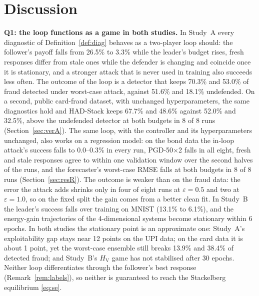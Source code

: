 \documentclass[conference]{IEEEtran}
\newcommand{\HV}{H_{\mathrm{V}}}
\begin{document}
\section{Discussion}\label{sec:disc}
\textbf{Q1: the loop functions as a game in both studies.} In Study~A every diagnostic of Definition~\ref{def:diag} behaves as a two-player loop should: the follower's payoff falls from 26.5\% to 3.3\% while the leader's budget rises, fresh responses differ from stale ones while the defender is changing and coincide once it is stationary, and a stronger attack that is never used in training also succeeds less often. The outcome of the loop is a detector that keeps 70.3\% and 53.0\% of fraud detected under worst-case attack, against 51.6\% and 18.1\% undefended. On a second, public card-fraud dataset, with unchanged hyperparameters, the same diagnostics hold and HAD-Stack keeps 67.7\% and 48.6\% against 52.0\% and 32.5\%, above the undefended detector at both budgets in 8 of 8 runs (Section~\ref{sec:verA}). The same loop, with the controller and its hyperparameters unchanged, also works on a regression model: on the bond data the in-loop attack's success falls to 0.0--0.3\% in every run, PGD-50$\times$2 falls in all eight, fresh and stale responses agree to within one validation window over the second halves of the runs, and the forecaster's worst-case RMSE falls at both budgets in 8 of 8 runs (Section~\ref{sec:resR}). The outcome is weaker than on the fraud data: the error the attack adds shrinks only in four of eight runs at $\varepsilon{=}0.5$ and two at $\varepsilon{=}1.0$, so on the fixed split the gain comes from a better clean fit. In Study~B the leader's success falls over training on MNIST (13.1\% to 6.1\%), and the energy-gain trajectories of the 4-dimensional systems become stationary within 6 epochs. In both studies the stationary point is an approximate one: Study~A's exploitability gap stays near 12 points on the UPI data; on the card data it is about 1 point, yet the worst-case ensemble still breaks 13.9\% and 38.4\% of detected fraud; and Study~B's $\HV$ game has not stabilised after 30 epochs. Neither loop differentiates through the follower's best response (Remark~\ref{rem:labels}), so neither is guaranteed to reach the Stackelberg equilibrium \eqref{eq:se}.
\end{document}
